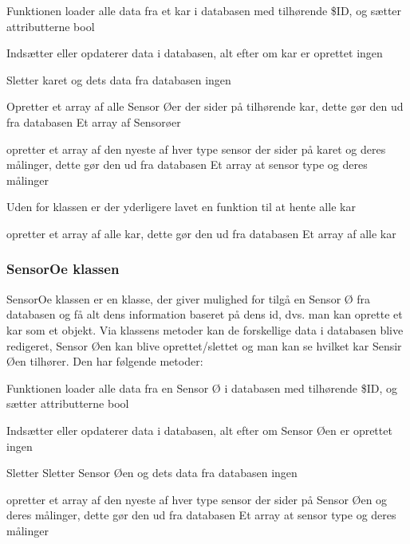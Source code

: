 {Funktionen loader alle data fra et kar i databasen med tilhørende \$ID, og sætter attributterne}
{bool}
{
}

{Indsætter eller opdaterer data i databasen, alt efter om kar er oprettet}
{ingen}

{Sletter karet og dets data fra databasen}
{ingen}

{Opretter et array af alle Sensor Øer der sider på tilhørende kar, dette gør den ud fra databasen}
{Et array af Sensorøer}

{opretter et array af den nyeste af hver type sensor der sider på karet og deres målinger, dette gør den ud fra databasen}
{Et array at sensor type og deres målinger}


Uden for klassen er der yderligere lavet en funktion til at hente alle kar

{opretter et array af alle kar, dette gør den ud fra databasen}
{Et array af alle kar}
{
}

\subsubsection{SensorOe klassen}
SensorOe klassen er en klasse, der giver mulighed for tilgå en Sensor Ø fra databasen og få alt dens information baseret på dens id, dvs. man kan oprette et kar som et objekt. Via klassens metoder kan de forskellige data i databasen blive redigeret, Sensor Øen kan blive oprettet/slettet og man kan se hvilket kar Sensir Øen tilhører. Den har følgende metoder:

{Funktionen loader alle data fra en Sensor Ø i databasen med tilhørende \$ID, og sætter attributterne}
{bool}
{
}

{Indsætter eller opdaterer data i databasen, alt efter om Sensor Øen er oprettet}
{ingen}

{Sletter Sletter Sensor Øen og dets data fra databasen}
{ingen}

{opretter et array af den nyeste af hver type sensor der sider på Sensor Øen og deres målinger, dette gør den ud fra databasen}
{Et array at sensor type og deres målinger}


